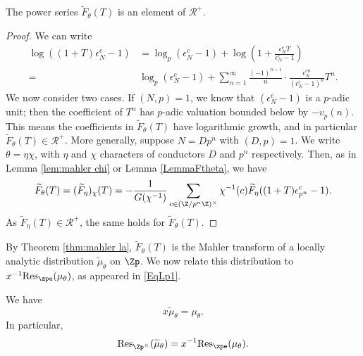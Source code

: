 \documentclass[a4paper,10pt, english, reqno]{smfart}
\numberwithin{equation}{section}
\begin{document}
\begin{lemma}\label{lem:bounded power series}
The power series $\widetilde{F}_\theta(T)$ is an element of $\mathscr{R}^+$.
\end{lemma}




\begin{proof}
We can write
\begin{align*} \log((1 + T) \epsilon_N^c - 1) &= \log_p(\epsilon_N^c - 1) + \log\left(1 + \frac{\epsilon_N^c T}{\epsilon_N^c - 1}\right)\\
=& \log_p(\epsilon_N^c - 1) +  \sum_{n = 1}^{\infty} \frac{(-1)^{n-1}}{n} \cdot\frac{\epsilon_N^{cn}}{(\epsilon_N^c - 1)^n} T^n. 
\end{align*}
We now consider two cases. If $(N, p) = 1$, we know that $(\epsilon_N^c - 1)$ is a $p$-adic unit; then the coefficient of $T^n$ has $p$-adic valuation bounded below by $-v_p(n)$. This means the coefficients in $\widetilde{F}_\theta(T)$ have logarithmic growth, and in particular $\widetilde{F}_\theta(T) \in \mathscr{R}^+$.  More generally, suppose $N = Dp^n$ with $(D, p) = 1$. We write $\theta = \eta\chi$, with $\eta$ and $\chi$ characters of conductors $D$ and $p^n$ respectively. Then, as in Lemma \ref{lem:mahler chi} or Lemma \ref{LemmaFtheta}, we have
\[ \widetilde{F}_\theta(T) = (\widetilde{F}_\eta)_\chi(T) = - \frac{1}{G(\chi^{-1})} \sum_{c \in (\Z / p^n \Z)^\times} \chi^{-1}(c) \widetilde{F}_\eta((1 + T) \epsilon_{p^n}^c - 1). \]
As $\widetilde{F}_\eta(T) \in \mathscr{R}^+$, the same holds for $\widetilde{F}_\theta(T)$.
\end{proof}

By Theorem \ref{thm:mahler la}, $\widetilde{F}_\theta(T)$ is the Mahler transform of a locally analytic distribution $\widetilde{\mu}_\theta$ on $\Zp$. We now relate this distribution to $x^{-1}\mathrm{Res}_{\zpe}(\mu_\theta)$, as appeared in \eqref{EqLp1}.

\begin{lemma}\label{lem:mu theta'}
We have 
\[x \widetilde{\mu}_\theta = \mu_\theta.\]
In particular,
\[
    \mathrm{Res}_{\Zp^\times}(\widetilde{\mu}_\theta) = x^{-1}\mathrm{Res}_{\zpe}(\mu_\theta).
\]
\end{lemma}
\end{document}
